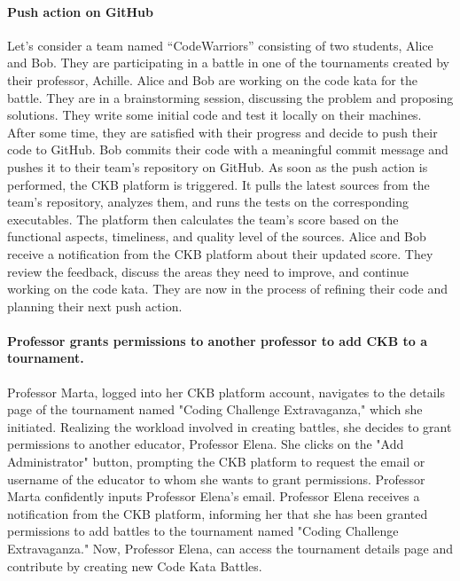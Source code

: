 \paragraph*{Push action on GitHub}
Let’s consider a team named “CodeWarriors” consisting of two students, Alice and Bob. 
They are participating in a battle in one of the tournaments created by their professor, Achille. 
Alice and Bob are working on the code kata for the battle. They are in a brainstorming session, discussing the problem and proposing solutions. 
They write some initial code and test it locally on their machines. 
After some time, they are satisfied with their progress and decide to push their code to GitHub. 
Bob commits their code with a meaningful commit message and pushes it to their team’s repository on GitHub. 
As soon as the push action is performed, the CKB platform is triggered. 
It pulls the latest sources from the team’s repository, analyzes them, and runs the tests on the corresponding executables. 
The platform then calculates the team’s score based on the functional aspects, timeliness, and quality level of the sources. 
Alice and Bob receive a notification from the CKB platform about their updated score. 
They review the feedback, discuss the areas they need to improve, and continue working on the code kata. 
They are now in the process of refining their code and planning their next push action.

\paragraph*{Professor grants permissions to another professor to add CKB to a tournament.}
Professor Marta, logged into her CKB platform account, navigates to the details page of the tournament named "Coding Challenge Extravaganza," which she initiated. 
Realizing the workload involved in creating battles, she decides to grant permissions to another educator, Professor Elena.
She clicks on the "Add Administrator" button, prompting the CKB platform to request the email or username of the educator to whom she wants to grant permissions. 
Professor Marta confidently inputs Professor Elena's email.
Professor Elena receives a notification from the CKB platform, informing her that she has been granted permissions to add battles to the tournament named "Coding Challenge Extravaganza."
Now, Professor Elena, can access the tournament details page and contribute by creating new Code Kata Battles. 

